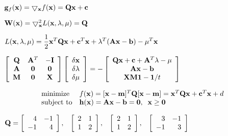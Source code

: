 \documentclass{article}
\def\lthtmlcheckvsize{\ifdim\ht\sizebox<\vsize 
  \ifdim\wd\sizebox<\hsize\expandafter\hfill\fi \expandafter\vfill
  \else\expandafter\vss\fi}%
\begin{document}
{\newpage\clearpage
{}%
$ {\bf g}_f({\bf x})=\bigtriangledown_{\bf x}f({\bf x})={\bf Qx}+{\bf c}$%
\lthtmlindisplaymathZ
\lthtmlcheckvsize\clearpage}

{\newpage\clearpage
{}%
$ {\bf W}({\bf x})=\bigtriangledown^2_{\bf x} L({\bf x},{\bf\lambda},{\bf\mu})={\bf Q}$%
\lthtmlindisplaymathZ
\lthtmlcheckvsize\clearpage}

{\newpage\clearpage
{}%
$\displaystyle L({\bf x},{\bf\lambda},{\bf\mu})
=\frac{1}{2}{\bf x}^T{\bf Qx}+{\bf c}^T{\bf x}
+{\bf\lambda}^T({\bf Ax}-{\bf b})-{\bf\mu}^T{\bf x}$%
\lthtmlindisplaymathZ
\lthtmlcheckvsize\clearpage}

{\newpage\clearpage
{}%
$\displaystyle \left[\begin{array}{ccc}
{\bf Q} & {\bf A}^T & -{\bf I}\\
{\bf A} & {\bf0} & {\bf0} \\
{\bf M} & {\bf0} & {\bf X}\end{array}\right]
\left[\begin{array}{c}
\delta{\bf x}\\\delta{\bf\lambda}\\\delta{\bf\mu}
\end{array}\right]
=-\left[\begin{array}{c}
{\bf Qx}+{\bf c}+{\bf A}^T{\bf\lambda}-{\bf\mu}\\
{\bf Ax}-{\bf b}\\{\bf XM1}-{\bf 1}/t
\end{array}\right]$%
\lthtmlindisplaymathZ
\lthtmlcheckvsize\clearpage}

{\newpage\clearpage
{}%
\begin{displaymath}\begin{array}{ll}
\mbox{minimize}    & f({\bf x})=[{\bf x}-{\bf m}]^T{\bf Q}[{\bf x}-{\bf m}]
={\bf x}^T{\bf Q}{\bf x}+{\bf c}^T{\bf x}+d \\
\mbox{subject to}  & {\bf h}({\bf x})={\bf A}{\bf x}-{\bf b}={\bf0},\;\;{\bf x}\ge {\bf0}
\end{array}\end{displaymath}%
\lthtmldisplayZ
\lthtmlcheckvsize\clearpage}

{\newpage\clearpage
{}%
$\displaystyle {\bf Q}=\left[\begin{array}{rr}4 & -1\\-1 & 4\end{array}\right],\;\;\;
\left[\begin{array}{rr}2 &  1\\1 & 2\end{array}\right],\;\;\;
\left[\begin{array}{rr}2 &  1\\1 & 2\end{array}\right],\;\;\;
\left[\begin{array}{rr}3 & -1\\-1 & 3\end{array}\right]$%
\lthtmlindisplaymathZ
\lthtmlcheckvsize\clearpage}
\end{document}
